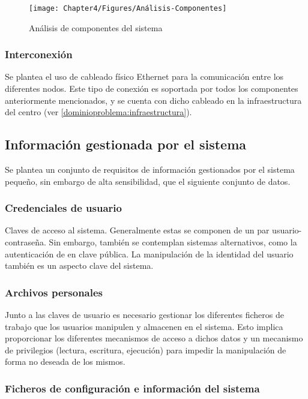 \begin{figure}[H]
  \centering
  \texttt{[image: Chapter4/Figures/Análisis-Componentes]}
  \caption[Análisis de componentes]{Análisis de componentes del sistema}
  \label{analisis:componentes}
\end{figure}

\subsubsection{Interconexión}

Se plantea el uso de cableado físico Ethernet para la comunicación entre los diferentes nodos. Este tipo de conexión es soportada por todos los componentes anteriormente mencionados, y se cuenta con dicho cableado en la infraestructura del centro (ver \ref{dominioproblema:infraestructura}).

\subsection{Información gestionada por el sistema}

Se plantea un conjunto de requisitos de información gestionados por el sistema pequeño, sin embargo de alta sensibilidad, que el siguiente conjunto de datos.

\subsubsection{Credenciales de usuario}

Claves de acceso al sistema. Generalmente estas se componen de un par usuario-contraseña. Sin embargo, también se contemplan sistemas alternativos, como la autenticación de en clave pública. La manipulación de la identidad del usuario también es un aspecto clave del sistema.

\subsubsection{Archivos personales}

Junto a las claves de usuario es necesario gestionar los diferentes ficheros de trabajo que los usuarios manipulen y almacenen en el sistema. Esto implica proporcionar los diferentes mecanismos de acceso a dichos datos y un mecanismo de privilegios (lectura, escritura, ejecución) para impedir la manipulación de forma no deseada de los mismos.

\subsubsection{Ficheros de configuración e información del sistema}

